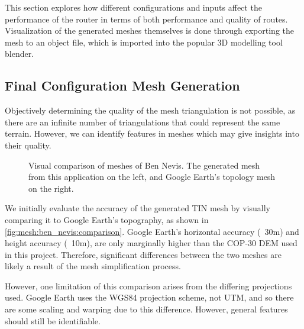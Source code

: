 \documentclass[12pt]{article}
\begin{document}
This section explores how different configurations and inputs affect the performance of the router in terms of both performance and quality of routes. Visualization of the generated meshes themselves is done through exporting the mesh to an object file, which is imported into the popular 3D modelling tool blender.

\subsection{Final Configuration Mesh Generation}

Objectively determining the quality of the mesh triangulation is not possible, as there are an infinite number of triangulations that could represent the same terrain. However, we can identify features in meshes which may give insights into their quality.

\begin{figure}[!htbp]
  \caption{Visual comparison of meshes of Ben Nevis. The generated mesh from this application on the left, and Google Earth's topology mesh on the right.}\label{fig:mesh:ben_nevis:comparison}
\end{figure}

We initially evaluate the accuracy of the generated TIN mesh by visually comparing it to Google Earth's topography, as shown in \autoref{fig:mesh:ben_nevis:comparison}. Google Earth's horizontal accuracy (~30m) and height accuracy (~10m), are only marginally higher than the COP-30 DEM used in this project. Therefore, significant differences between the two meshes are likely a result of the mesh simplification process.

However, one limitation of this comparison arises from the differing projections used. Google Earth uses the WGS84 projection scheme, not UTM, and so there are some scaling and warping due to this difference. However, general features should still be identifiable.
\end{document}
